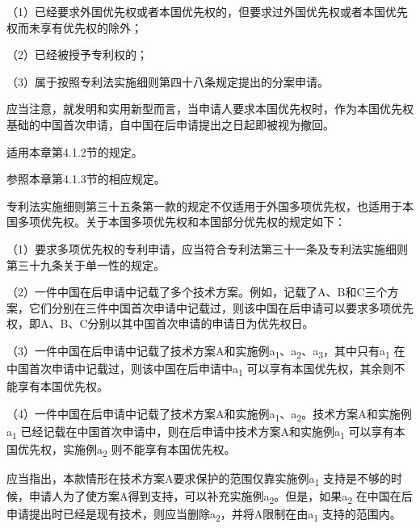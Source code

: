 {\setlength{\parindent}{17.1bp}（1）已经要求外国优先权或者本国优先权的，但要求过外国优先权或者本国优先权而未享有优先权的除外；\par}

{\setlength{\parindent}{17.1bp}（2）已经被授予专利权的；\par}

{\setlength{\parindent}{17.1bp}（3）属于按照专利法实施细则第四十八条规定提出的分案申请。\par}

应当注意，就发明和实用新型而言，当申请人要求本国优先权时，作为本国优先权基础的中国首次申请，自中国在后申请提出之日起即被视为撤回。

适用本章第4.1.2节的规定。

参照本章第4.1.3节的相应规定。

专利法实施细则第三十五条第一款的规定不仅适用于外国多项优先权，也适用于本国多项优先权。关于本国多项优先权和本国部分优先权的规定如下：

{\setlength{\parindent}{17.1bp}（1）要求多项优先权的专利申请，应当符合专利法第三十一条及专利法实施细则第三十九条关于单一性的规定。\par}

{\setlength{\parindent}{17.1bp}（2）一件中国在后申请中记载了多个技术方案。例如，记载了A、B和C三个方案，它们分别在三件中国首次申请中记载过，则该中国在后申请可以要求多项优先权，即A、B、C分别以其中国首次申请的申请日为优先权日。\par}

{\setlength{\parindent}{17.1bp}（3）一件中国在后申请中记载了技术方案A和实施例a\textsubscript{1}、a\textsubscript{2}、a\textsubscript{3}，其中只有a\textsubscript{1} 在中国首次申请中记载过，则该中国在后申请中a\textsubscript{1} 可以享有本国优先权，其余则不能享有本国优先权。\par}

{\setlength{\parindent}{17.1bp}（4）一件中国在后申请中记载了技术方案A和实施例a\textsubscript{1}、a\textsubscript{2}。技术方案A和实施例a\textsubscript{1} 已经记载在中国首次申请中，则在后申请中技术方案A和实施例a\textsubscript{1} 可以享有本国优先权，实施例a\textsubscript{2} 则不能享有本国优先权。\par}

{\setlength{\parindent}{22.7bp}应当指出，本款情形在技术方案A要求保护的范围仅靠实施例a\textsubscript{1} 支持是不够的时候，申请人为了使方案A得到支持，可以补充实施例a\textsubscript{2}。但是，如果a\textsubscript{2} 在中国在后申请提出时已经是现有技术，则应当删除a\textsubscript{2}，并将A限制在由a\textsubscript{1} 支持的范围内。\par}

